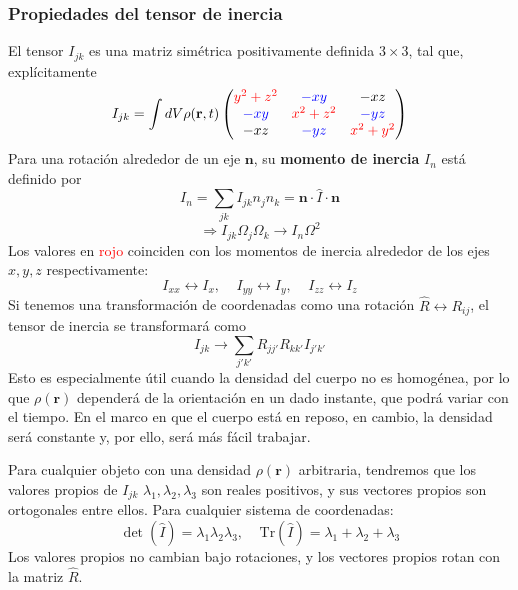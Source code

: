 \documentclass[]{article}
\numberwithin{equation}{section}
\begin{document}
\subsubsection{Propiedades del tensor de inercia}
El tensor \(I_{jk}\) es una matriz simétrica positivamente definida \(3\times 3\), tal que, explícitamente
\begin{equation}
	I_{jk} = \int dV \rho(\textbf{r}, t) \begin{pmatrix}
		\textcolor{red}{y^2 + z^2} & \textcolor{blue}{-xy} & -xz\\
		\textcolor{blue}{-xy} & \textcolor{red}{x^2 + z^2} & \textcolor{blue}{-yz}\\
		-xz & \textcolor{blue}{-yz} & \textcolor{red}{x^2 + y^2}
	\end{pmatrix}
\end{equation}
Para una rotación alrededor de un eje \(\mathbf{n}\), su \textbf{momento de inercia} \(I_{n}\) está definido por
\begin{equation}
	I_{n} = \sum_{jk} I_{jk} n_{j} n_{k} = \mathbf{n}\cdot \hat{I}\cdot \mathbf{n}
\end{equation}
\begin{equation}
	\Rightarrow I_{jk} \Omega_{j} \Omega_{k} \rightarrow I_{n} \Omega^2
\end{equation}
Los valores en \textcolor{red}{rojo} coinciden con los momentos de inercia alrededor de los ejes \(x,y,z\) respectivamente:
\begin{equation}
	I_{xx}\leftrightarrow I_{x}, ~~~~~	I_{yy}\leftrightarrow I_{y}, ~~~~~	I_{zz}\leftrightarrow I_{z}
\end{equation}
Si tenemos una transformación de coordenadas como una rotación \(\hat{R} \leftrightarrow R_{ij}\), el tensor de inercia se transformará como
\begin{equation}
	I_{jk} \rightarrow \sum_{j'k'} R_{jj'} R_{kk'} I_{j'k'}
\end{equation}
Esto es especialmente útil cuando la densidad del cuerpo no es homogénea, por lo que \(\rho(\mathbf{r})\) dependerá de la orientación en un dado instante, que podrá variar con el tiempo. En el marco en que el cuerpo está en reposo, en cambio, la densidad será constante y, por ello, será más fácil trabajar.

Para cualquier objeto con una densidad \(\rho(\mathbf{r})\) arbitraria, tendremos que los valores propios de \(I_{jk}\) \(\lambda_{1},\lambda_{2},\lambda_{3}\) son reales positivos, y sus vectores propios son ortogonales entre ellos. Para cualquier sistema de coordenadas:
\begin{equation}
	\det(\hat{I}) = \lambda_{1}\lambda_{2}\lambda_{3}, ~~~~~\mathrm{Tr}(\hat{I}) = \lambda_{1} + \lambda_{2} + \lambda_{3}
\end{equation}
Los valores propios no cambian bajo rotaciones, y los vectores propios rotan con la matriz \(\hat{R}\). 
\end{document}
